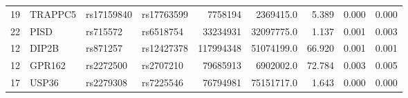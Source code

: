 \documentclass{article}
\begin{document}
\begin{table}[ht]
{\begin{threeparttable}
\begin{tabular}{llllrrrrr}
  19 & TRAPPC5 & rs17159840 & rs17763599 & 7758194 & 2369415.0 & 5.389 & 0.000 & 0.000 \\
  22 & PISD & rs715572 & rs6518754 & 33234931 & 32097775.0 & 1.137 & 0.001 & 0.003 \\
  12 & DIP2B & rs871257 & rs12427378 & 117994348 & 51074199.0 & 66.920 & 0.001 & 0.001 \\
  12 & GPR162 & rs2272500 & rs2707210 & 79685913 & 6902002.0 & 72.784 & 0.003 & 0.005 \\
  17 & USP36 & rs2279308 & rs7225546 & 76794981 & 75151717.0 & 1.643 & 0.000 & 0.000 \\
   \hline
\end{tabular}
\end{threeparttable}
}
\end{table}
\end{document}
